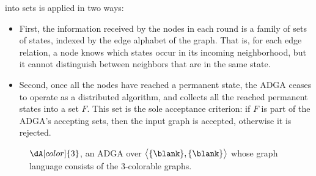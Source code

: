 \documentclass[a4paper,11pt,twoside]{report} \pdfoutput=1
\begin{document}
\begin{description}[style=nextline]
  into sets is applied in two ways:
  \begin{itemize}
  \item First, the information received by the nodes in each round is
    a family of sets of states, indexed by the edge alphabet of the
    graph. That is, for each edge relation, a node knows which states
    occur in its incoming neighborhood, but it cannot distinguish
    between neighbors that are in the same state.
  \item Second, once all the nodes have reached a permanent state, the
    ADGA ceases to operate as a distributed algorithm, and collects
    all the reached permanent states into a set $F$. This set is the
    sole acceptance criterion: if $F$ is part of the ADGA's accepting
    sets, then the input graph is accepted, otherwise it is rejected.
  \end{itemize}
\end{description}

\begin{figure}[h!]
  \alignpic
     \caption{$\dA[color]{3}$\!, an ADGA over
    $\bigl\langle\{\blank\},\{\blank\}\bigr\rangle$ whose graph
    language consists of the 3-colorable graphs.}
  \label{fig:ADGA_3_colorable}
\end{figure}
\end{document}
